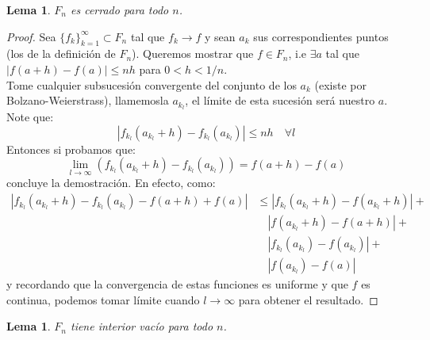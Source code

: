 \documentclass{article}
\newtheorem{lemma}[theorem]{Lema}
\theoremstyle{definition}
\newcommand{\suc}[4][\infty]{\{{#2_#3}\}_{#3=#4}^#1}
\begin{document}
\begin{lemma}
$F_n$ es cerrado para todo $n$.
\end{lemma}
\begin{proof}
Sea $\suc{f}{k}{1}\subset F_n$ tal que $f_k\rightarrow f$ y sean $a_k$ sus correspondientes puntos (los de la definición de $F_n$). Queremos mostrar que $f\in F_n$, i.e $\exists a$ tal que $|f(a+h)-f(a)|\leq nh$ para $0<h<1/n$.\\
Tome cualquier subsucesión convergente del conjunto de los $a_k$ (existe por Bolzano-Weierstrass), llamemosla $a_{k_l}$, el límite de esta sucesión será nuestro $a$. Note que:
$$
|f_{k_l}(a_{k_l}+h)-f_{k_l}(a_{k_l})|\leq nh\quad \forall l
$$
Entonces si probamos que:
$$
\lim_{l\rightarrow\infty}(f_{k_l}(a_{k_l}+h)-f_{k_l}(a_{k_l}))=f(a+h)-f(a)
$$
concluye la demostración. En efecto, como:\\
\begin{align*}
|f_{k_l}(a_{k_l}+h)-f_{k_l}(a_{k_l})-f(a+h)+f(a)|&\leq |f_{k_l}(a_{k_l}+h)-f(a_{k_l}+h)|+\\
&\quad |f(a_{k_l}+h)-f(a+h)|+\\
&\quad|f_{k_l}(a_{k_l})-f(a_{k_l})|+\\
&\quad |f(a_{k_l})-f(a)|
\end{align*}
y recordando que la convergencia de estas funciones es uniforme y que $f$ es continua, podemos tomar límite cuando $l\rightarrow\infty$ para obtener el resultado. 
\end{proof}
\begin{lemma}
$F_n$ tiene interior vacío para todo $n$.
\end{lemma}
\end{document}
